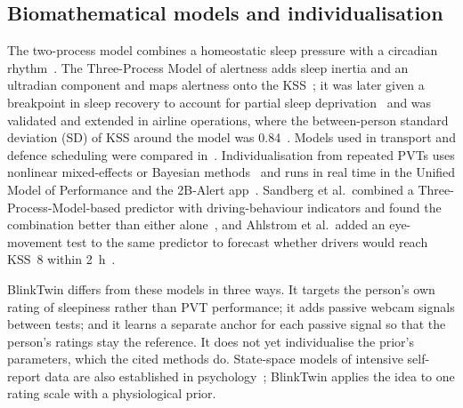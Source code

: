 \subsection{Biomathematical models and individualisation}
The two-process model combines a homeostatic sleep pressure with a circadian rhythm~\cite{borbely1982two}. The Three-Process Model of alertness adds sleep inertia and an ultradian component and maps alertness onto the KSS~\cite{akerstedt1995validation,akerstedt1997three,akerstedt2004predictions}; it was later given a breakpoint in sleep recovery to account for partial sleep deprivation~\cite{akerstedt2008accounting} and was validated and extended in airline operations, where the between-person standard deviation (SD) of KSS around the model was 0.84~\cite{ingre2014validating}. Models used in transport and defence scheduling were compared in~\cite{mallis2004summary,dawson2011modelling}. Individualisation from repeated PVTs uses nonlinear mixed-effects or Bayesian methods~\cite{olofsen2004nonlinear,vandongen2007optimization,rajaraman2008individualized} and runs in real time in the Unified Model of Performance and the 2B-Alert app~\cite{ramakrishnan2016unified,liu2017real,reifman2019twobalert}. Sandberg et al.\ combined a Three-Process-Model-based predictor with driving-behaviour indicators and found the combination better than either alone~\cite{sandberg2011detecting}, and Ahlstrom et al.\ added an eye-movement test to the same predictor to forecast whether drivers would reach KSS~8 within 2~h~\cite{ahlstrom2013fit}.

BlinkTwin differs from these models in three ways. It targets the person's own rating of sleepiness rather than PVT performance; it adds passive webcam signals between tests; and it learns a separate anchor for each passive signal so that the person's ratings stay the reference. It does not yet individualise the prior's parameters, which the cited methods do. State-space models of intensive self-report data are also established in psychology~\cite{asparouhov2018dynamic}; BlinkTwin applies the idea to one rating scale with a physiological prior.


